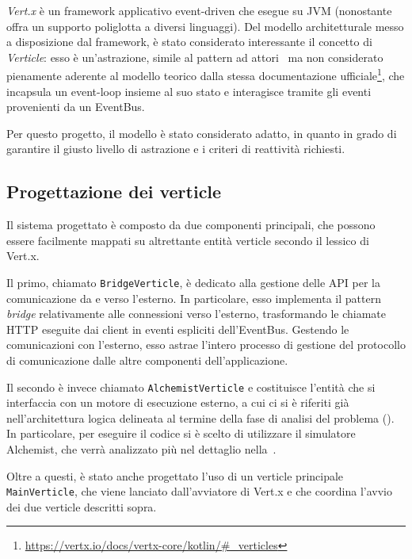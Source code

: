       \emph{Vert.x} è un framework applicativo event-driven che esegue su JVM (nonostante offra un supporto poliglotta a diversi linguaggi).
      Del modello architetturale messo a disposizione dal framework, è stato considerato interessante il concetto di \emph{Verticle}:
      esso è un'astrazione, simile al pattern ad attori~\cite{DBLP:conf/ijcai/HewittBS73} ma non considerato pienamente aderente al modello teorico dalla stessa documentazione ufficiale\footnote{\url{https://vertx.io/docs/vertx-core/kotlin/\#_verticles}},
      che incapsula un event-loop insieme al suo stato e interagisce tramite gli eventi provenienti da un EventBus.

      Per questo progetto, il modello è stato considerato adatto, in quanto in grado di garantire il giusto livello di astrazione e i criteri di reattività richiesti.

    \subsection{Progettazione dei verticle}
      Il sistema progettato è composto da due componenti principali, che possono essere facilmente mappati su altrettante entità verticle secondo il lessico di Vert.x.

      Il primo, chiamato \texttt{BridgeVerticle}, è dedicato alla gestione delle API per la comunicazione da e verso l'esterno.
      In particolare, esso implementa il pattern \emph{bridge} relativamente alle connessioni verso l'esterno, trasformando le chiamate HTTP eseguite dai client in eventi espliciti dell'EventBus.
      Gestendo le comunicazioni con l'esterno, esso astrae l'intero processo di gestione del protocollo di comunicazione dalle altre componenti dell'applicazione.

      Il secondo è invece chiamato \texttt{AlchemistVerticle} e costituisce l'entità che si interfaccia con un motore di esecuzione esterno,
      a cui ci si è riferiti già nell'architettura logica delineata al termine della fase di analisi del problema ().
      In particolare, per eseguire il codice si è scelto di utilizzare il simulatore Alchemist, che verrà analizzato più nel dettaglio nella~.

      Oltre a questi, è stato anche progettato l'uso di un verticle principale \texttt{MainVerticle}, che viene lanciato dall'avviatore di Vert.x e che coordina l'avvio dei due verticle descritti sopra.

